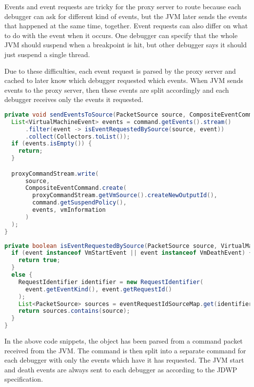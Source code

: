 \documentclass[..thesis.tex]{subfiles}
\begin{document}
Events and event requests are tricky for the proxy server to route because each debugger can ask for different kind of events, but the JVM later sends the events that happened at the same time, together.
Event requests can also differ on what to do with the event when it occurs.
One debugger can specify that the whole JVM should suspend when a breakpoint is hit, but other debugger says it should just suspend a single thread.

Due to these difficulties, each event request is parsed by the proxy server and cached to later know which debugger requested which events.
When JVM sends events to the proxy server, then these events are split accordingly and each debugger receives only the events it requested.

\begin{lstlisting}[language=Java]
private void sendEventsToSource(PacketSource source, CompositeEventCommand command) {
  List<VirtualMachineEvent> events = command.getEvents().stream()
      .filter(event -> isEventRequestedBySource(source, event))
      .collect(Collectors.toList());
  if (events.isEmpty()) {
    return;
  }

  proxyCommandStream.write(
      source,
      CompositeEventCommand.create(
        proxyCommandStream.getVmSource().createNewOutputId(), 
        command.getSuspendPolicy(), 
        events, vmInformation
      )
  );
}
\end{lstlisting}
\begin{lstlisting}[language=Java]
private boolean isEventRequestedBySource(PacketSource source, VirtualMachineEvent event){
  if (event instanceof VmStartEvent || event instanceof VmDeathEvent) {
    return true;
  }
  else {
    RequestIdentifier identifier = new RequestIdentifier(
      event.getEventKind(), event.getRequestId()
    );
    List<PacketSource> sources = eventRequestIdSourceMap.get(identifier);
    return sources.contains(source);
  }
}
\end{lstlisting}

In the above code snippets, the  object has been parsed from a command packet received from the JVM.
The command is then split into a separate command for each debugger with only the events which have it has requested.
The JVM start and death events are always sent to each debugger as according to the JDWP specification. \cite{oracle_jdwp_spec}
\end{document}
